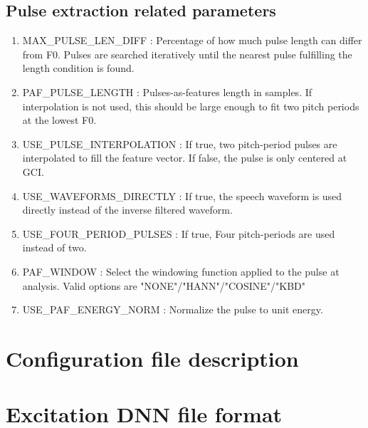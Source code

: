 \documentclass[a4paper, 11pt]{article}
\begin{document}
\subsection{Pulse extraction related parameters}

\begin{enumerate}
    \item[]                                        
    MAX\_PULSE\_LEN\_DIFF :
    Percentage of how much pulse length can differ from F0. Pulses are searched iteratively until the nearest pulse fulfilling the length condition is found.     
    \item[]
    PAF\_PULSE\_LENGTH :
    Pulses-as-features length in samples. If interpolation is not used, this should be large enough to fit two pitch periods at the lowest F0.
    \item[] 
    USE\_PULSE\_INTERPOLATION :
    If true, two pitch-period pulses are interpolated to fill the feature vector. If false, the pulse is only centered at GCI.
    \item[] 
    USE\_WAVEFORMS\_DIRECTLY :
    If true, the speech waveform is used directly instead of the inverse filtered waveform.
    \item[]
    USE\_FOUR\_PERIOD\_PULSES :
    If true, Four pitch-periods are used instead of two.
    \item[] PAF\_WINDOW :
    Select the windowing function applied to the pulse at analysis. Valid options are 
    "NONE"/"HANN"/"COSINE"/"KBD"
    \item[]
    USE\_PAF\_ENERGY\_NORM :
    Normalize the pulse to unit energy.
\end{enumerate}


\newpage

\begin{appendices}
\section{Configuration file description}
\section{Excitation DNN file format}
\end{appendices}
\end{document}
